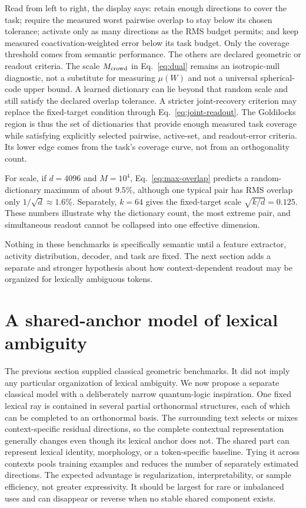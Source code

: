 \documentclass[
  aps,
  reprint,
  superscriptaddress,
  floatfix,
  nofootinbib,
  longbibliography
]{revtex4-2}
\newcommand{\Msem}{M}
\begin{document}
Read from left to right, the display says: retain enough directions to cover
the task; require the measured worst pairwise overlap to stay below its chosen
tolerance; activate only as many directions as the RMS budget permits; and
keep measured coactivation-weighted error below its task budget.  Only the
coverage threshold comes from semantic performance.  The others are declared
geometric or readout criteria.
The scale $M_{\rm crowd}$ in Eq.~\eqref{eq:dual} remains an isotropic-null
diagnostic, not a substitute for measuring $\mu(W)$ and not a universal
spherical-code upper bound.  A learned dictionary can lie beyond that random
scale and still satisfy the declared overlap tolerance.  A stricter
joint-recovery criterion may replace the fixed-target condition through
Eq.~\eqref{eq:joint-readout}.  The Goldilocks region is thus the set of
dictionaries that provide enough measured task coverage while satisfying
explicitly selected pairwise, active-set, and readout-error criteria.  Its
lower edge comes from the task's coverage curve, not from an orthogonality
count.

For scale, if $d=4096$ and $\Msem=10^4$, Eq.~\eqref{eq:max-overlap} predicts a
random-dictionary maximum of about $9.5\%$, although one typical pair has RMS
overlap only $1/\sqrt d\approx1.6\%$.  Separately, $k=64$ gives the
fixed-target scale $\sqrt{k/d}=0.125$.  These numbers illustrate why the
dictionary count, the most extreme pair, and simultaneous readout cannot be
collapsed into one effective dimension.

Nothing in these benchmarks is specifically semantic until a feature
extractor, activity distribution, decoder, and task are fixed.  The next
section adds a separate and stronger hypothesis about how context-dependent
readout may be organized for lexically ambiguous tokens.

\section{A shared-anchor model of lexical ambiguity}
\label{sec:reference}

The previous section supplied classical geometric benchmarks.  It did not
imply any particular organization of lexical ambiguity.  We now propose a
separate classical model with a deliberately narrow quantum-logic inspiration.
One fixed lexical ray is contained in several partial orthonormal structures,
each of which can be completed to an orthonormal basis.  The
surrounding text selects or mixes context-specific residual directions, so the
complete contextual representation generally changes even though its lexical
anchor does not.  The shared part can represent lexical identity, morphology,
or a token-specific baseline.  Tying it across contexts pools training
examples and reduces the number of separately estimated directions.  The
expected advantage is regularization, interpretability, or sample efficiency,
not greater expressivity.  It should be largest for rare or imbalanced uses and
can disappear or reverse when no stable shared component exists.
\end{document}
